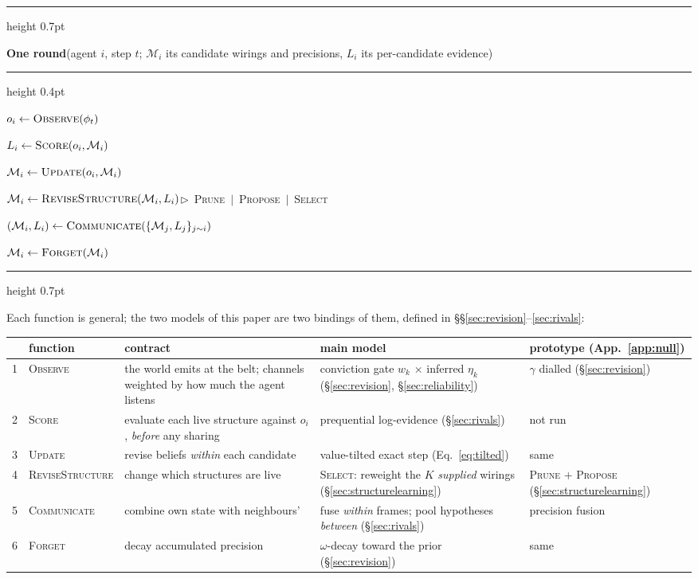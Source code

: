 \documentclass[runningheads]{llncs}
\begin{document}
\medskip
\hrule height 0.7pt
\vspace{2.5pt}
{\small\noindent\textbf{One round}\quad(agent $i$, step $t$; $\mathcal{M}_i$ its candidate
wirings and precisions, $L_i$ its per-candidate evidence)\par}
\vspace{1.5pt}
\hrule height 0.4pt
\vspace{3.5pt}
{\small
\par\noindent{}$o_i\gets\textsc{Observe}(\phi_t)$
\par\noindent{}$L_i\gets\textsc{Score}(o_i,\mathcal{M}_i)$
\par\noindent{}$\mathcal{M}_i\gets\textsc{Update}(o_i,\mathcal{M}_i)$
\par\noindent{}$\mathcal{M}_i\gets\textsc{ReviseStructure}(\mathcal{M}_i,L_i)$\hfill$\triangleright$\ \mbox{\textsc{Prune} $\mid$ \textsc{Propose} $\mid$ \textsc{Select}}
\par\noindent{}$(\mathcal{M}_i,L_i)\gets\textsc{Communicate}(\{\mathcal{M}_j,L_j\}_{j\sim i})$
\par\noindent{}$\mathcal{M}_i\gets\textsc{Forget}(\mathcal{M}_i)$
\par}
\vspace{3.5pt}
\hrule height 0.7pt
\medskip

\noindent Each function is general; the two models of this paper are two bindings of
them, defined in \S\S\ref{sec:revision}--\ref{sec:rivals}:

\begin{center}
\footnotesize
\setlength{\tabcolsep}{4pt}
\begin{tabular}{@{}c@{\hskip 5pt}l p{3.6cm} p{3.1cm} p{2.2cm}@{}}
\hline
 & function & contract & main model & prototype (App.~\ref{app:null}) \\
\hline
1 & \textsc{Observe} & the world emits at the belt; channels weighted by how much the agent
listens & conviction gate $w_k$ $\times$ inferred $\eta_k$ (\S\ref{sec:revision},
\S\ref{sec:reliability}) & $\gamma$ dialled (\S\ref{sec:revision}) \\
2 & \textsc{Score} & evaluate each live structure against $o_i$, \emph{before} any sharing &
prequential log-evidence (\S\ref{sec:rivals}) & not run \\
3 & \textsc{Update} & revise beliefs \emph{within} each candidate & value-tilted exact step
(Eq.~\ref{eq:tilted}) & same \\
4 & \textsc{ReviseStructure} & change which structures are live & \textsc{Select}: reweight
the $K$ \emph{supplied} wirings (\S\ref{sec:structurelearning}) & \textsc{Prune} $+$
\textsc{Propose} (\S\ref{sec:structurelearning}) \\
5 & \textsc{Communicate} & combine own state with neighbours' & fuse \emph{within} frames;
pool hypotheses \emph{between} (\S\ref{sec:rivals}) & precision fusion \\
6 & \textsc{Forget} & decay accumulated precision & $\omega$-decay toward the prior
(\S\ref{sec:revision}) & same \\
\hline
\end{tabular}
\end{center}
\end{document}
